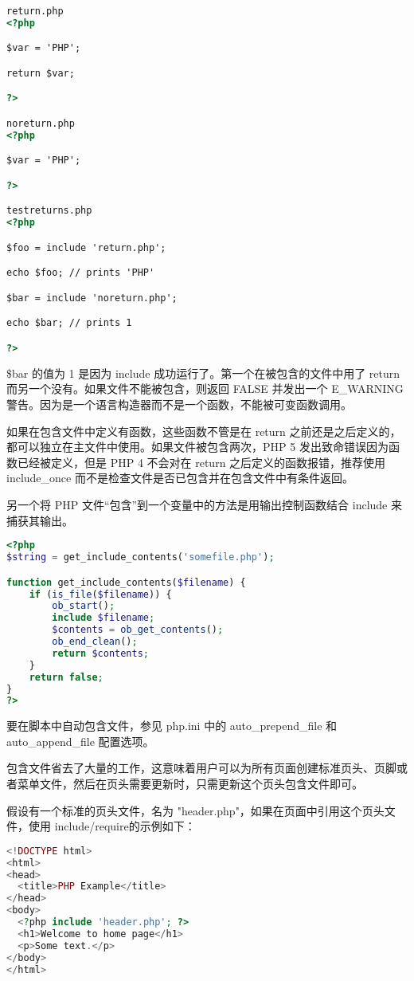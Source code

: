 \begin{lstlisting}[language=HTML]
return.php
<?php

$var = 'PHP';

return $var;

?>

noreturn.php
<?php

$var = 'PHP';

?>

testreturns.php
<?php

$foo = include 'return.php';

echo $foo; // prints 'PHP'

$bar = include 'noreturn.php';

echo $bar; // prints 1

?>
\end{lstlisting}


\$bar 的值为 1 是因为 include 成功运行了。第一个在被包含的文件中用了 return 而另一个没有。如果文件不能被包含，则返回 FALSE 并发出一个 E\_WARNING 警告。因为是一个语言构造器而不是一个函数，不能被可变函数调用。

如果在包含文件中定义有函数，这些函数不管是在 return 之前还是之后定义的，都可以独立在主文件中使用。如果文件被包含两次，PHP 5 发出致命错误因为函数已经被定义，但是 PHP 4 不会对在 return 之后定义的函数报错，推荐使用 include\_once 而不是检查文件是否已包含并在包含文件中有条件返回。

另一个将 PHP 文件“包含”到一个变量中的方法是用输出控制函数结合 include 来捕获其输出。


\begin{lstlisting}[language=PHP]
<?php
$string = get_include_contents('somefile.php');

function get_include_contents($filename) {
    if (is_file($filename)) {
        ob_start();
        include $filename;
        $contents = ob_get_contents();
        ob_end_clean();
        return $contents;
    }
    return false;
}
?>
\end{lstlisting}

要在脚本中自动包含文件，参见 php.ini 中的 auto\_prepend\_file 和 auto\_append\_file 配置选项。

包含文件省去了大量的工作，这意味着用户可以为所有页面创建标准页头、页脚或者菜单文件，然后在页头需要更新时，只需更新这个页头包含文件即可。

假设有一个标准的页头文件，名为 "header.php"，如果在页面中引用这个页头文件，使用 include/require的示例如下：


\begin{lstlisting}[language=PHP]
<!DOCTYPE html>
<html>
<head>
  <title>PHP Example</title>
</head>
<body>
  <?php include 'header.php'; ?>
  <h1>Welcome to home page</h1>
  <p>Some text.</p>
</body>
</html>
\end{lstlisting}

